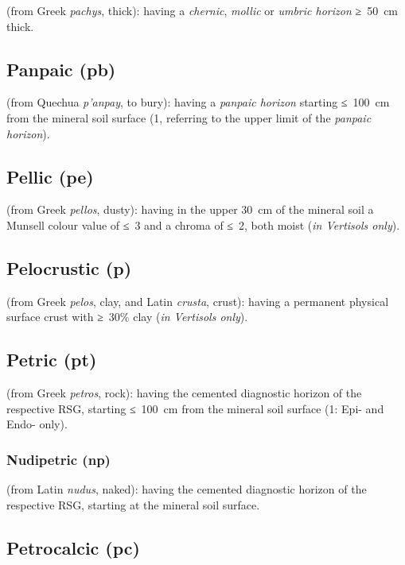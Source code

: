 \documentclass[
  letterpaper,
  DIV=11,
  numbers=noendperiod]{scrreprt}
\begin{document}
(from Greek \emph{pachys}, thick): having a \emph{chernic},
\emph{mollic} or \emph{umbric horizon} ≥~50~cm thick.

\hypertarget{panpaic-pb}{%
\subsection{Panpaic (pb)}\label{panpaic-pb}}

(from Quechua \emph{p'anpay}, to bury): having a \emph{panpaic horizon}
starting ≤~100~cm from the mineral soil surface (1, referring to the
upper limit of the \emph{panpaic horizon}).

\hypertarget{pellic-pe}{%
\subsection{Pellic (pe)}\label{pellic-pe}}

(from Greek \emph{pellos}, dusty): having in the upper 30~cm of the
mineral soil a Munsell colour value of ≤~3 and a chroma of ≤~2, both
moist (\emph{in Vertisols only}).

\hypertarget{pelocrustic-p}{%
\subsection{Pelocrustic (p)}\label{pelocrustic-p}}

(from Greek \emph{pelos}, clay, and Latin \emph{crusta}, crust): having
a permanent physical surface crust with ≥~30\% clay (\emph{in Vertisols
only}).

\hypertarget{petric-pt}{%
\subsection{Petric (pt)}\label{petric-pt}}

(from Greek \emph{petros}, rock): having the cemented diagnostic horizon
of the respective RSG, starting ≤~100~cm from the mineral soil surface
(1: Epi- and Endo- only).

\hypertarget{nudipetric-np}{%
\subsubsection{Nudipetric (np)}\label{nudipetric-np}}

(from Latin \emph{nudus}, naked): having the cemented diagnostic horizon
of the respective RSG, starting at the mineral soil surface.

\hypertarget{petrocalcic-pc}{%
\subsection{Petrocalcic (pc)}\label{petrocalcic-pc}}
\end{document}
